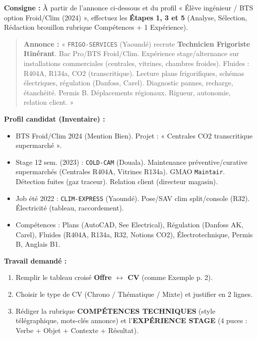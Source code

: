 \documentclass[11pt]{article}
\begin{document}
\begin{exercice}
\textbf{Consigne :} À partir de l'annonce ci-dessous et du profil « Élève ingénieur / BTS option Froid/Clim (2024) », effectuez les \textbf{Étapes 1, 3 et 5} (Analyse, Sélection, Rédaction brouillon rubrique Compétences + 1 Expérience).
\begin{quote}
\textbf{Annonce :} « \texttt{FRIGO-SERVICES} (Yaoundé) recrute \textbf{Technicien Frigoriste Itinérant}. Bac Pro/BTS Froid/Clim. Expérience stage/alternance sur installations commerciales (centrales, vitrines, chambres froides). Fluides : R404A, R134a, CO2 (transcritique). Lecture plans frigorifiques, schémas électriques, régulation (Danfoss, Carel). Diagnostic pannes, recharge, étanchéité. Permis B. Déplacements régionaux. Rigueur, autonomie, relation client. »
\end{quote}
\textbf{Profil candidat (Inventaire) :}
\begin{itemize}
    \item BTS Froid/Clim 2024 (Mention Bien). Projet : « Centrales CO2 transcritique supermarché ».
    \item Stage 12 sem. (2023) : \texttt{COLD-CAM} (Douala). Maintenance préventive/curative supermarchés (Centrales R404A, Vitrines R134a). GMAO \texttt{Maintair}. Détection fuites (gaz traceur). Relation client (directeur magasin).
    \item Job été 2022 : \texttt{CLIM-EXPRESS} (Yaoundé). Pose/SAV clim split/console (R32). Électricité (tableau, raccordement).
    \item Compétences : Plans (AutoCAD, See Electrical), Régulation (Danfoss AK, Carel), Fluides (R404A, R134a, R32, Notions CO2), Électrotechnique, Permis B, Anglais B1.
\end{itemize}
\textbf{Travail demandé :}
\begin{enumerate}
    \item Remplir le tableau croisé \textbf{Offre $\leftrightarrow$ CV} (comme Exemple p. 2).
    \item Choisir le type de CV (Chrono / Thématique / Mixte) et justifier en 2 lignes.
    \item Rédiger la rubrique \textbf{COMPÉTENCES TECHNIQUES} (style télégraphique, mots-clés annonce) et l'\textbf{EXPÉRIENCE STAGE} (4 puces : Verbe + Objet + Contexte + Résultat).
\end{enumerate}
\end{exercice}
\end{document}
